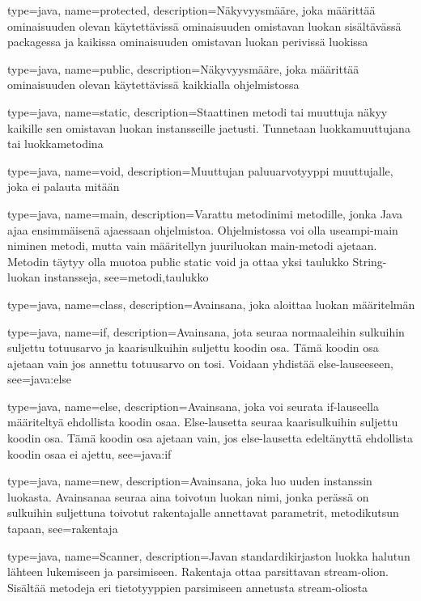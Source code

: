 {
	type=java,
	name=protected,
	description={Näkyvyysmääre, joka määrittää ominaisuuden olevan käytettävissä ominaisuuden
omistavan luokan sisältävässä packagessa ja kaikissa ominaisuuden omistavan luokan perivissä
luokissa}
}

{
	type=java,
	name=public,
	description={Näkyvyysmääre, joka määrittää ominaisuuden olevan käytettävissä kaikkialla
ohjelmistossa}
}

{
	type=java,
	name=static,
	description={Staattinen metodi tai muuttuja näkyy kaikille sen omistavan luokan instansseille
jaetusti. Tunnetaan luokkamuuttujana tai luokkametodina}
}

{
	type=java,
	name=void,
	description={Muuttujan paluuarvotyyppi muuttujalle, joka ei palauta mitään}
}

{
	type=java,
	name=main,
	description={Varattu metodinimi metodille, jonka Java ajaa ensimmäisenä ajaessaan ohjelmistoa.
Ohjelmistossa voi olla useampi-main niminen metodi, mutta vain määritellyn juuriluokan main-metodi
ajetaan. Metodin täytyy olla muotoa public static void ja ottaa yksi taulukko String-luokan
instansseja},
	see={metodi,taulukko}
}

{
	type=java,
	name=class,
	description={Avainsana, joka aloittaa luokan määritelmän}
}

{
	type=java,
	name=if,
	description={Avainsana, jota seuraa normaaleihin sulkuihin suljettu totuusarvo ja
kaarisulkuihin suljettu koodin osa. Tämä koodin osa ajetaan vain jos annettu totuusarvo on
tosi. Voidaan yhdistää else-lauseeseen},
	see=java:else
}

{
	type=java,
	name=else,
	description={Avainsana, joka voi seurata if-lauseella määriteltyä ehdollista koodin osaa.
Else-lausetta seuraa kaarisulkuihin suljettu koodin osa. Tämä koodin osa ajetaan vain, jos
else-lausetta edeltänyttä ehdollista koodin osaa ei ajettu},
	see=java:if
}

{
	type=java,
	name=new,
	description={Avainsana, joka luo uuden instanssin luokasta. Avainsanaa seuraa aina toivotun
luokan nimi, jonka perässä on sulkuihin suljettuna toivotut rakentajalle annettavat parametrit,
metodikutsun tapaan},
	see=rakentaja
}

{
	type=java,
	name=Scanner,
	description={Javan standardikirjaston luokka halutun lähteen lukemiseen ja parsimiseen.
Rakentaja ottaa parsittavan stream-olion. Sisältää metodeja eri tietotyyppien parsimiseen
annetusta stream-oliosta}
}

